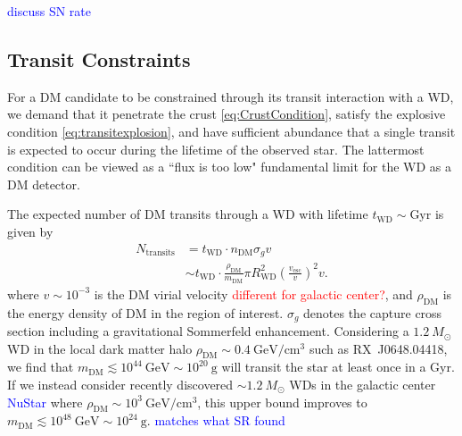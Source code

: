 \documentclass[twocolumn,showpacs,preprintnumbers,amsmath,amssymb,prd]{revtex4}
\newcommand{\GeV}{\text{GeV}}
\def\r{\right)}
\def\l{\left(}
\begin{document}
\textcolor{blue}{discuss SN rate}

\subsection{Transit Constraints}
\label{sec:TransitConstraints}

For a DM candidate to be constrained through its transit interaction with a WD, we demand that it penetrate the crust \eqref{eq:CrustCondition}, satisfy the explosive condition \eqref{eq:transitexplosion}, and have sufficient abundance that a single transit is expected to occur during the lifetime of the observed star. The lattermost condition can be viewed as a ``flux is too low" fundamental limit for the WD as a DM detector.

The expected number of DM transits through a WD with lifetime $t_\text{WD} \sim \text{Gyr}$ is given by
\begin{align}
N_\text{transits}  &= t_\text{WD} \cdot n_\text{DM} \sigma_g v \nonumber\\
 &  \sim t_\text{WD} \cdot \frac{\rho_{\text{DM}}}{m_\text{DM}} \pi R_\text{WD}^2 \l\frac{v_\text{esc}}{v}\r^2 v.
\label{eq:TransitFluxCondition}
\end{align}
where $v \sim 10^{-3}$ is the DM virial velocity \textcolor{red}{different for galactic center?}, and $\rho_{\text{DM}}$ is the energy density of DM in the region of interest. $\sigma_g$ denotes the capture cross section including a gravitational Sommerfeld enhancement. Considering a $1.2 ~M_{\odot}$ WD in the local dark matter halo $\rho_{\text{DM}} \sim 0.4~\text{GeV}/\text{cm}^3$ such as RX~J0648.04418, we find that $m_\text{DM} \lesssim 10^{44} ~\GeV \sim 10^{20} ~\text{g}$ will transit the star at least once in a Gyr. If we instead consider recently discovered $\sim 1.2 ~M_{\odot}$ WDs in the galactic center \textcolor{blue}{NuStar} where $\rho_{\text{DM}} \sim 10^3 ~\text{GeV}/\text{cm}^3$, this upper bound improves to $m_\text{DM} \lesssim 10^{48} ~\GeV \sim 10^{24} ~\text{g}$. \textcolor{blue}{matches what SR found}
\end{document}

